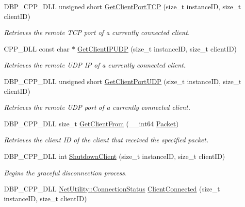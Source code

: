 \begin{DoxyCompactItemize}
DBP\_\-CPP\_\-DLL unsigned short \hyperlink{namespacemn_a793ffb4d1c671e27ff1e1a2c72642c42}{GetClientPortTCP} (size\_\-t instanceID, size\_\-t clientID)
\begin{DoxyCompactList}\small\item\em Retrieves the remote TCP port of a currently connected client. \item\end{DoxyCompactList}\item 
CPP\_\-DLL const char $\ast$ \hyperlink{namespacemn_a43a0cdd23d509a9c04dc266d381bb690}{GetClientIPUDP} (size\_\-t instanceID, size\_\-t clientID)
\begin{DoxyCompactList}\small\item\em Retrieves the remote UDP IP of a currently connected client. \item\end{DoxyCompactList}\item 
DBP\_\-CPP\_\-DLL unsigned short \hyperlink{namespacemn_a3a7965d08132aef367e2c767c845c781}{GetClientPortUDP} (size\_\-t instanceID, size\_\-t clientID)
\begin{DoxyCompactList}\small\item\em Retrieves the remote UDP port of a currently connected client. \item\end{DoxyCompactList}\item 
DBP\_\-CPP\_\-DLL size\_\-t \hyperlink{namespacemn_a6bb3498a01e2cccb3b0b29a30cb87eb1}{GetClientFrom} (\_\-\_\-int64 \hyperlink{class_packet}{Packet})
\begin{DoxyCompactList}\small\item\em Retrieves the client ID of the client that received the specified packet. \item\end{DoxyCompactList}\item 
DBP\_\-CPP\_\-DLL int \hyperlink{namespacemn_aabf2e7fc125113e54f60f4b018faa8a5}{ShutdownClient} (size\_\-t instanceID, size\_\-t clientID)
\begin{DoxyCompactList}\small\item\em Begins the graceful disconnection process. \item\end{DoxyCompactList}\item 
DBP\_\-CPP\_\-DLL \hyperlink{class_net_utility_a7eae52138f8bd597ffc67ebf07e86b6d}{NetUtility::ConnectionStatus} \hyperlink{namespacemn_a182830933908a7e2338d710565c2bbb4}{ClientConnected} (size\_\-t instanceID, size\_\-t clientID)

\end{DoxyCompactItemize}
